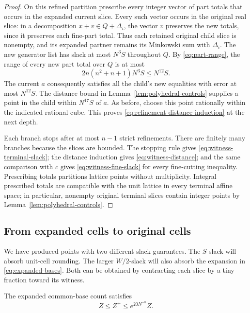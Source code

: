 \begin{proof}
On this refined partition prescribe every integer vector of part
totals that occurs in the expanded current slice.  Every such
vector occurs in the original real slice: in a decomposition
\(x+v\in Q+\Delta_i\), the vector \(v\) preserves the new
totals, since it preserves each fine-part total.  Thus each
retained original child slice is nonempty, and its expanded
partner remains its Minkowski sum with \(\Delta_i\).  The new
generator list has slack at most \(N^3S\) throughout \(Q\).
By \eqref{eq:part-range}, the range of every new part total over
\(Q\) is at most
\[
 2n(n^2+n+1)N^3S\le N^{12}S.
\]
The current \(a\) consequently satisfies all the child's new
equalities with error at most \(N^{12}S\).  The distance bound
in Lemma~\ref{lem:polyhedral-controls} supplies a point in the
child within \(N^{17}S\) of \(a\).  As before, choose this point
rationally within the indicated rational cube.  This proves
\eqref{eq:refinement-distance-induction} at the next depth.

Each branch stops after at most \(n-1\) strict refinements.
There are finitely many branches because the slices are bounded.
The stopping rule gives \eqref{eq:witness-terminal-slack}; the
distance induction gives \eqref{eq:witness-distance}; and the
same comparison with \(c\) gives \eqref{eq:witness-fine-slack}
for every fine-cutting inequality.  Prescribing totals partitions
lattice points without multiplicity.  Integral prescribed totals
are compatible with the unit lattice in every terminal affine
space; in particular, nonempty original terminal slices contain
integer points by Lemma~\ref{lem:polyhedral-controls}.
\end{proof}

\subsection{From expanded cells to original cells}

We have produced points with two different slack guarantees.
The \(S\)-slack will absorb unit-cell rounding.  The larger
\(W/2\)-slack will also absorb the expansion in
\eqref{eq:expanded-bases}.  Both can be obtained by contracting
each slice by a tiny fraction toward its witness.

\begin{proposition}\label{prop:expansion}
The expanded common-base count satisfies
\begin{equation}\label{eq:expansion-comparison}
 Z\le Z^+\le e^{20N^{-8}}Z.
\end{equation}
\end{proposition}

